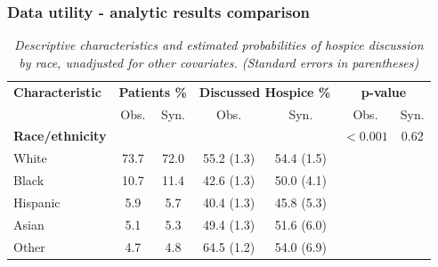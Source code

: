 \documentclass[11pt,handout]{beamer}
\begin{document}
\begin{frame}
\frametitle{Data utility - analytic results comparison}

\small

\begin{table}
\centering
\caption{\emph{Descriptive characteristics and estimated probabilities of hospice discussion by race, unadjusted for other covariates. (Standard errors in parentheses)}}
\begin{tabular}{ l cccccc} \hline 
 \textbf{Characteristic} & \multicolumn{2}{c}{\textbf{Patients \%}}  & \multicolumn{2}{c}{\textbf{Discussed Hospice \%}}  &  \multicolumn{2}{c}{\textbf{p-value}}\\ 
& Obs. & Syn. &  Obs. & Syn. & Obs. & Syn.  \\ \hline
\textbf{Race/ethnicity} & & &  & &  $<0.001$  & 0.62\\
  White & 73.7 & 72.0 & 55.2 (1.3)& 54.4 (1.5) & & \\
       Black & 10.7 & 11.4 & 42.6 (1.3)& 50.0 (4.1) & & \\
      Hispanic & 5.9 & 5.7 & 40.4 (1.3) & 45.8 (5.3) & &  \\
 Asian & 5.1 & 5.3 & 49.4 (1.3) & 51.6 (6.0) & &  \\
   Other & 4.7 & 4.8  & 64.5 (1.2) & 54.0 (6.9) & & \\ \hline
\end{tabular}
\label{haiden_biv_race}
\end{table}

\end{frame}

\end{document}
